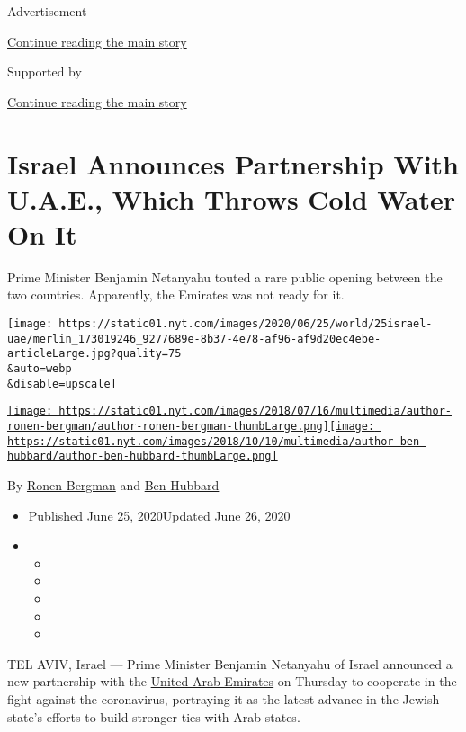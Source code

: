 Advertisement

\protect\hyperlink{after-top}{Continue reading the main story}

Supported by

\protect\hyperlink{after-sponsor}{Continue reading the main story}

\hypertarget{israel-announces-partnership-with-uae-which-throws-cold-water-on-it}{%
\section{Israel Announces Partnership With U.A.E., Which Throws Cold
Water On
It}\label{israel-announces-partnership-with-uae-which-throws-cold-water-on-it}}

Prime Minister Benjamin Netanyahu touted a rare public opening between
the two countries. Apparently, the Emirates was not ready for it.

\texttt{[image: https://static01.nyt.com/images/2020/06/25/world/25israel-uae/merlin\_173019246\_9277689e-8b37-4e78-af96-af9d20ec4ebe-articleLarge.jpg?quality=75\\\&auto=webp\\\&disable=upscale]}

\href{https://www.nytimes.com/by/ronen-bergman}{\texttt{[image: https://static01.nyt.com/images/2018/07/16/multimedia/author-ronen-bergman/author-ronen-bergman-thumbLarge.png]}}\href{https://www.nytimes.com/by/ben-hubbard}{\texttt{[image: https://static01.nyt.com/images/2018/10/10/multimedia/author-ben-hubbard/author-ben-hubbard-thumbLarge.png]}}

By \href{https://www.nytimes.com/by/ronen-bergman}{Ronen Bergman} and
\href{https://www.nytimes.com/by/ben-hubbard}{Ben Hubbard}

\begin{itemize}
\item
  Published June 25, 2020Updated June 26, 2020
\item
  \begin{itemize}
  \item
  \item
  \item
  \item
  \item
  \end{itemize}
\end{itemize}

TEL AVIV, Israel --- Prime Minister Benjamin Netanyahu of Israel
announced a new partnership with the
\href{https://www.nytimes.com/2020/07/14/science/mars-united-arab-emirates.html}{United
Arab Emirates} on Thursday to cooperate in the fight against the
coronavirus, portraying it as the latest advance in the Jewish state's
efforts to build stronger ties with Arab states.

